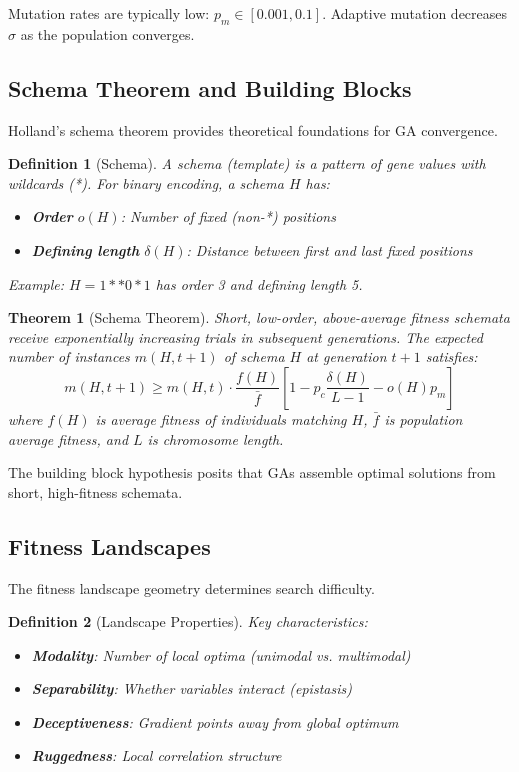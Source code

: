 \documentclass[a4paper, 11pt]{article}
\newtheorem{definition}{Definition}[section]
\newtheorem{theorem}{Theorem}[section]
\begin{document}
Mutation rates are typically low: $p_m \in [0.001, 0.1]$. Adaptive mutation decreases $\sigma$ as the population converges.

\subsection{Schema Theorem and Building Blocks}

Holland's schema theorem provides theoretical foundations for GA convergence.

\begin{definition}[Schema]
A schema (template) is a pattern of gene values with wildcards (*). For binary encoding, a schema $H$ has:
\begin{itemize}
\item \textbf{Order} $o(H)$: Number of fixed (non-*) positions
\item \textbf{Defining length} $\delta(H)$: Distance between first and last fixed positions
\end{itemize}
Example: $H = 1**0*1$ has order 3 and defining length 5.
\end{definition}

\begin{theorem}[Schema Theorem]
Short, low-order, above-average fitness schemata receive exponentially increasing trials in subsequent generations. The expected number of instances $m(H, t+1)$ of schema $H$ at generation $t+1$ satisfies:
\begin{equation}
m(H, t+1) \geq m(H, t) \cdot \frac{f(H)}{\bar{f}} \left[1 - p_c \frac{\delta(H)}{L-1} - o(H) p_m \right]
\end{equation}
where $f(H)$ is average fitness of individuals matching $H$, $\bar{f}$ is population average fitness, and $L$ is chromosome length.
\end{theorem}

The building block hypothesis posits that GAs assemble optimal solutions from short, high-fitness schemata.

\subsection{Fitness Landscapes}

The fitness landscape geometry determines search difficulty.

\begin{definition}[Landscape Properties]
Key characteristics:
\begin{itemize}
\item \textbf{Modality}: Number of local optima (unimodal vs. multimodal)
\item \textbf{Separability}: Whether variables interact (epistasis)
\item \textbf{Deceptiveness}: Gradient points away from global optimum
\item \textbf{Ruggedness}: Local correlation structure
\end{itemize}
\end{definition}
\end{document}
